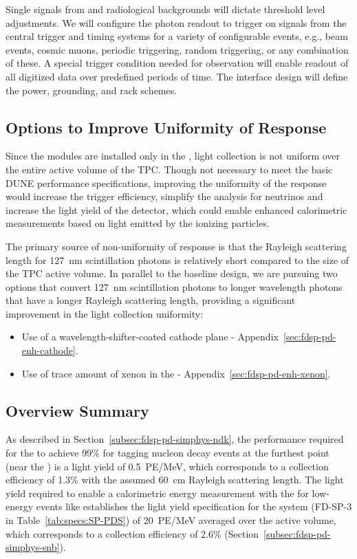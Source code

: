 Single \phel signals from  and radiological backgrounds will dictate threshold level adjustments.
We will configure the photon readout to trigger on signals from the central trigger and timing systems for a variety of configurable events, e.g., beam events, cosmic
muons, periodic triggering, random triggering, or any combination of
these. A special trigger condition needed for  observation will enable readout of all digitized data over predefined periods of time.
The interface design will define the power, grounding, and rack schemes.


\subsection{Options to Improve Uniformity of Response} 

Since the  modules are installed only in the , light collection is not uniform over the entire active volume of the TPC. 
Though not necessary to meet the basic DUNE performance specifications, improving the uniformity of the response would increase the trigger efficiency, simplify the analysis for  neutrinos and increase the light yield of the detector, which could enable enhanced calorimetric measurements based on light emitted by the ionizing particles.

The primary source of non-uniformity of response is that the Rayleigh scattering length for \SI{127}{nm} scintillation photons is relatively short compared to the size of the TPC active volume.   
In parallel to the baseline design, we are pursuing two options that convert \SI{127}{nm} scintillation photons to longer wavelength photons that have a longer Rayleigh scattering length, providing a significant improvement in the light collection uniformity:

\begin{itemize}
\item Use of a wavelength-shifter-coated cathode plane - Appendix~\ref{sec:fdsp-pd-enh-cathode}.
\item Use of trace amount of xenon in the  - Appendix~\ref{sec:fdsp-pd-enh-xenon}.
\end{itemize}


\subsection{Overview Summary} 
\label{sec:fdsp-pd-ov-summ}

As described in Section~\ref{subsec:fdsp-pd-simphys-ndk}, the performance required for the  to achieve 99\% for tagging nucleon decay events at the furthest point (near the ) is a light yield of \SI{0.5}{PE/MeV}, which corresponds to a collection efficiency of 1.3\% with the assumed \SI{60}{cm} Rayleigh scattering length. The light yield required to enable a calorimetric energy measurement with the  for low-energy events like  establishes the light yield specification for the system (FD-SP-3 in Table~\ref{tab:specs:SP-PDS}) of \SI{20}{PE/MeV} averaged over the active volume, which corresponds to a collection efficiency of 2.6\% (Section~\ref{subsec:fdsp-pd-simphys-snb}).

